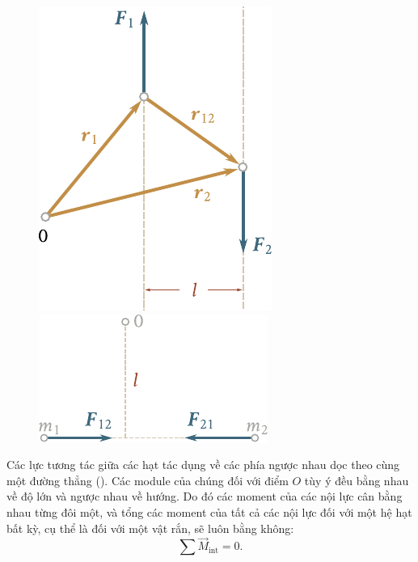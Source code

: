 \begin{figure}[!htb]
	\begin{minipage}[t]{0.5\linewidth}
		\begin{center}
			\includegraphics[scale=0.95]{figures/ch_03/fig_3_22.pdf}
			\caption[]{}
			\label{fig:3_22}
		\end{center}
	\end{minipage}
	\hspace{-0.05cm}
	\begin{minipage}[t]{0.5\linewidth}
		\begin{center}
			\includegraphics[scale=0.95]{figures/ch_03/fig_3_23.pdf}
			\caption[]{}
			\label{fig:3_23}
		\end{center}
	\end{minipage}
\end{figure}

Các lực tương tác giữa các hạt tác dụng về các phía ngược nhau dọc theo cùng một đường thẳng (). Các module của chúng đối với điểm $O$ tùy ý đều bằng nhau về độ lớn và ngược nhau về hướng. Do đó các moment của các nội lực cân bằng nhau từng đôi một, và tổng các moment của tất cả các nội lực đối với một hệ hạt bất kỳ, cụ thể là đối với một vật rắn, sẽ luôn bằng không: 
\begin{equation}\label{eq:3_117}
\sum\vec{M}_{\text{int}} = 0.
\end{equation}

